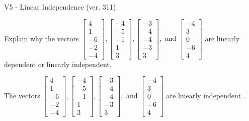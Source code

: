 \begin{exercise}
  \begin{exerciseTitle}V5 - Linear Independence (ver. 311)\end{exerciseTitle}
  \begin{exerciseStatement}
    Explain why the vectors \(\left[\begin{array}{r}
4 \\
1 \\
-6 \\
-2 \\
-4
\end{array}\right] , \left[\begin{array}{r}
-4 \\
-5 \\
-1 \\
1 \\
3
\end{array}\right] , \left[\begin{array}{r}
-3 \\
-4 \\
-4 \\
-3 \\
3
\end{array}\right] , \text{ and } \left[\begin{array}{r}
-4 \\
3 \\
0 \\
-6 \\
4
\end{array}\right]\) are linearly dependent or linearly independent.	


  \end{exerciseStatement}
  \begin{exerciseAnswer}
   The vectors \(\left[\begin{array}{r}
4 \\
1 \\
-6 \\
-2 \\
-4
\end{array}\right] , \left[\begin{array}{r}
-4 \\
-5 \\
-1 \\
1 \\
3
\end{array}\right] , \left[\begin{array}{r}
-3 \\
-4 \\
-4 \\
-3 \\
3
\end{array}\right] , \text{ and } \left[\begin{array}{r}
-4 \\
3 \\
0 \\
-6 \\
4
\end{array}\right]\) are 
  	 linearly independent  .
  


  \end{exerciseAnswer}
\end{exercise}
